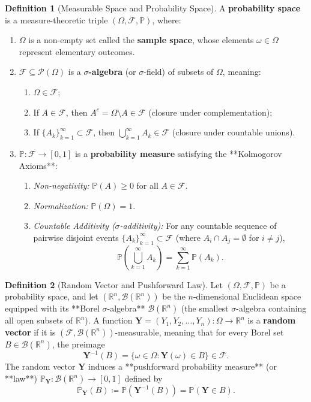 \documentclass[11pt, letterpaper]{article}
\theoremstyle{definition}
\newtheorem{definition}{Definition}[section]
\theoremstyle{remark}
\newcommand{\R}{\mathbb{R}}
\newcommand{\Prob}{\mathbb{P}}
\newcommand{\F}{\mathcal{F}}
\begin{document}
\begin{definition}[Measurable Space and Probability Space]
A \textbf{probability space} is a measure-theoretic triple $(\Omega, \F, \Prob)$, where:
\begin{enumerate}[label=(\roman*)]
    \item $\Omega$ is a non-empty set called the \textbf{sample space}, whose elements $\omega \in \Omega$ represent elementary outcomes.
    \item $\F \subseteq \mathcal{P}(\Omega)$ is a \textbf{$\sigma$-algebra} (or $\sigma$-field) of subsets of $\Omega$, meaning:
    \begin{enumerate}[label=(\alph*)]
        \item $\Omega \in \F$;
        \item If $A \in \F$, then $A^c = \Omega \setminus A \in \F$ (closure under complementation);
        \item If $\{A_k\}_{k=1}^{\infty} \subset \F$, then $\bigcup_{k=1}^{\infty} A_k \in \F$ (closure under countable unions).
    \end{enumerate}
    \item $\Prob : \F \to [0, 1]$ is a \textbf{probability measure} satisfying the **Kolmogorov Axioms**:
    \begin{enumerate}[label=(\alph*)]
        \item \textit{Non-negativity:} $\Prob(A) \ge 0$ for all $A \in \F$.
        \item \textit{Normalization:} $\Prob(\Omega) = 1$.
        \item \textit{Countable Additivity ($\sigma$-additivity):} For any countable sequence of pairwise disjoint events $\{A_k\}_{k=1}^{\infty} \subset \F$ (where $A_i \cap A_j = \emptyset$ for $i \neq j$),
        \[
            \Prob\left(\bigcup_{k=1}^{\infty} A_k\right) = \sum_{k=1}^{\infty} \Prob(A_k).
        \]
    \end{enumerate}
\end{enumerate}
\end{definition}

\begin{definition}[Random Vector and Pushforward Law]
Let $(\Omega, \F, \Prob)$ be a probability space, and let $(\R^n, \mathcal{B}(\R^n))$ be the $n$-dimensional Euclidean space equipped with its **Borel $\sigma$-algebra** $\mathcal{B}(\R^n)$ (the smallest $\sigma$-algebra containing all open subsets of $\R^n$). A function $\mathbf{Y} = (Y_1, Y_2, \dots, Y_n) : \Omega \to \R^n$ is a \textbf{random vector} if it is $(\F, \mathcal{B}(\R^n))$-measurable, meaning that for every Borel set $B \in \mathcal{B}(\R^n)$, the preimage
\[
    \mathbf{Y}^{-1}(B) = \{\omega \in \Omega : \mathbf{Y}(\omega) \in B\} \in \F.
\]
The random vector $\mathbf{Y}$ induces a **pushforward probability measure** (or **law**) $\Prob_{\mathbf{Y}} : \mathcal{B}(\R^n) \to [0,1]$ defined by
\[
    \Prob_{\mathbf{Y}}(B) \coloneqq \Prob\left(\mathbf{Y}^{-1}(B)\right) = \Prob(\mathbf{Y} \in B).
\]
\end{definition}
\end{document}
